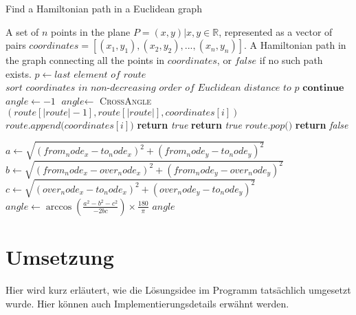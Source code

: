 \documentclass[a4paper,10pt,ngerman]{scrartcl}
\begin{document}
\begin{algorithm}[H]
\caption{Find a Hamiltonian path in a Euclidean graph}
\begin{algorithmic}[1]\label{alg:algorithm}
\Require A set of $n$ points in the plane $P={(x,y)| x,y \in \mathbb{R}}$, represented as a vector of pairs $\textit{coordinates}=[(x_1,y_1), (x_2,y_2),..., (x_n,y_n)]$.
\Ensure A Hamiltonian path in the graph connecting all the points in $\textit{coordinates}$, or $\textit{false}$ if no such path exists.
\State $p\gets \textit{last element of } \textit{route}$
\State $\textit{sort } \textit{coordinates } \textit{in non-decreasing order of Euclidean distance to } p$
\EndIf
{}
\State $\textbf{continue}$
\EndIf
\State $\textit{angle}\gets -1$
\State $\textit{angle}\gets$ \textsc{CrossAngle}$(\textit{route}[|\textit{route}|-1], \textit{route}[|\textit{route}|], \textit{coordinates}[i])$
\EndIf
{}
\State $\textit{route.append(}\textit{coordinates}[i]\textit{)}$
\State \textbf{return} \textit{true}
\EndIf
{}
\State \textbf{return} \textit{true}
\Else
\State $\textit{route.pop()}$
\EndIf
\EndIf
\EndFor
\State \textbf{return} \textit{false}
\end{algorithmic}
\begin{algorithmic}[2]\label{alg:algorithm2}
\end{algorithmic}
\State $\textit{a}\gets \sqrt{(from_node_x - to_node_x)^2 + (from_node_y - to_node_y)^2}$
\State $\textit{b}\gets \sqrt{(from_node_x - over_node_x)^2 + (from_node_y - over_node_y)^2}$
\State $\textit{c}\gets \sqrt{(over_node_x - to_node_x)^2 + (over_node_y - to_node_y)^2}$
\State $\textit{angle} \gets \arccos\left(\frac{a^2 - b^2 - c^2}{-2bc}\right) \times \frac{180}{\pi}$
\State \Return $angle$
\EndProcedure
\end{algorithm}



    \newpage
    \section{Umsetzung}\label{sec:umsetzung}
    Hier wird kurz erläutert, wie die Lösungsidee im Programm tatsächlich umgesetzt wurde.
    Hier können auch Implementierungsdetails erwähnt werden.
\end{document}
